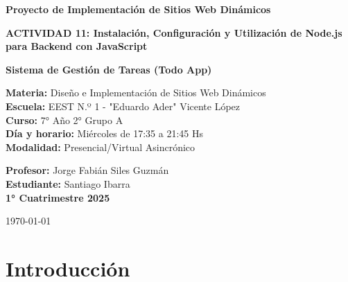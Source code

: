 \documentclass[12pt,a4paper]{article}
\begin{document}
\begin{titlepage}
    \centering
    \vspace*{2cm}
    
    {\Huge\bfseries Proyecto de Implementación de Sitios Web Dinámicos\par}
    \vspace{1cm}
    
    {\Large\bfseries ACTIVIDAD 11: Instalación, Configuración y Utilización de Node.js para Backend con JavaScript\par}
    \vspace{2cm}
    
    {\Large\bfseries Sistema de Gestión de Tareas (Todo App)\par}
    \vspace{2cm}
    
    \begin{minipage}{0.4\textwidth}
        \begin{flushleft}
            \large
            \textbf{Materia:} Diseño e Implementación de Sitios Web Dinámicos\\
            \textbf{Escuela:} EEST N.º 1 - "Eduardo Ader" Vicente López\\
            \textbf{Curso:} 7° Año 2° Grupo A\\
            \textbf{Día y horario:} Miércoles de 17:35 a 21:45 Hs\\
            \textbf{Modalidad:} Presencial/Virtual Asincrónico
        \end{flushleft}
    \end{minipage}
    \hfill
    \begin{minipage}{0.4\textwidth}
        \begin{flushright}
            \large
            \textbf{Profesor:} Jorge Fabián Siles Guzmán\\
            \textbf{Estudiante:} Santiago Ibarra\\
            \textbf{1° Cuatrimestre 2025}
        \end{flushright}
    \end{minipage}
    
    \vfill
    {\large \today\par}
\end{titlepage}

\tableofcontents
\newpage

\section{Introducción}
\end{document}
